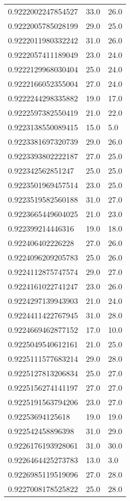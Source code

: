 \begin{center}
\begin{supertabular}[H]{p{0.30\textwidth}p{0.05\textwidth}p{0.05\textwidth}}
0.9222002247854527 & 33.0 & 26.0 \\ 
0.9222005785028199 & 29.0 & 25.0 \\ 
0.9222011980332242 & 31.0 & 26.0 \\ 
0.9222057411189049 & 23.0 & 24.0 \\ 
0.9222129968030404 & 25.0 & 24.0 \\ 
0.9222166052355004 & 27.0 & 24.0 \\ 
0.9222244298335882 & 19.0 & 17.0 \\ 
0.9222597382550419 & 21.0 & 22.0 \\ 
0.9223138550089415 & 15.0 & 5.0 \\ 
0.9223381697320739 & 29.0 & 26.0 \\ 
0.9223393802222187 & 27.0 & 25.0 \\ 
0.922342562851247 & 25.0 & 25.0 \\ 
0.9223501969457514 & 23.0 & 25.0 \\ 
0.9223519582560188 & 31.0 & 27.0 \\ 
0.9223665449604025 & 21.0 & 23.0 \\ 
0.922399214446316 & 19.0 & 18.0 \\ 
0.922406402226228 & 27.0 & 26.0 \\ 
0.9224096209205783 & 25.0 & 26.0 \\ 
0.9224112875747574 & 29.0 & 27.0 \\ 
0.9224161022741247 & 23.0 & 26.0 \\ 
0.9224297139943903 & 21.0 & 24.0 \\ 
0.9224411422767945 & 31.0 & 28.0 \\ 
0.9224669462877152 & 17.0 & 10.0 \\ 
0.9225049540612161 & 21.0 & 25.0 \\ 
0.9225111577683214 & 29.0 & 28.0 \\ 
0.9225127813206834 & 25.0 & 27.0 \\ 
0.9225156274141197 & 27.0 & 27.0 \\ 
0.9225191563794206 & 23.0 & 27.0 \\ 
0.92253694125618 & 19.0 & 19.0 \\ 
0.922542458896398 & 31.0 & 29.0 \\ 
0.9226176193928061 & 31.0 & 30.0 \\ 
0.9226464425273783 & 13.0 & 3.0 \\ 
0.9226985119519096 & 27.0 & 28.0 \\ 
0.9227008178525822 & 25.0 & 28.0 \\ 

\end{supertabular}
\end{center}

